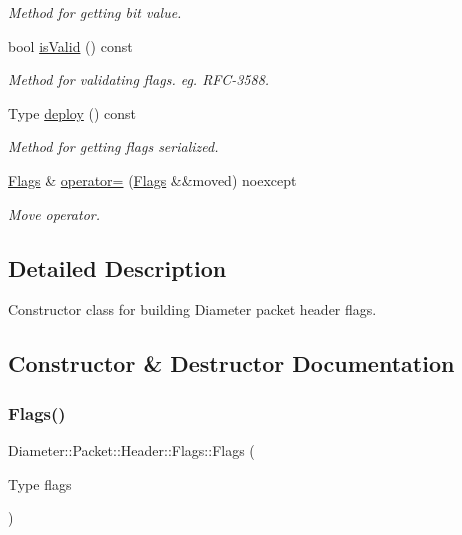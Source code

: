 \begin{DoxyCompactItemize}
\begin{DoxyCompactList}\small\item\em Method for getting bit value. \end{DoxyCompactList}\item 
bool \hyperlink{classDiameter_1_1Packet_1_1Header_1_1Flags_ae577fd786c656522b958395fb140dd8d}{is\+Valid} () const
\begin{DoxyCompactList}\small\item\em Method for validating flags. eg. R\+F\+C-\/3588. \end{DoxyCompactList}\item 
Type \hyperlink{classDiameter_1_1Packet_1_1Header_1_1Flags_a6bb796dff7f3e8f128262fb2d3a549bb}{deploy} () const
\begin{DoxyCompactList}\small\item\em Method for getting flags serialized. \end{DoxyCompactList}\item 
\hyperlink{classDiameter_1_1Packet_1_1Header_1_1Flags}{Flags} \& \hyperlink{classDiameter_1_1Packet_1_1Header_1_1Flags_afd99abaebff289fdc859696929fea0da}{operator=} (\hyperlink{classDiameter_1_1Packet_1_1Header_1_1Flags}{Flags} \&\&moved) noexcept
\begin{DoxyCompactList}\small\item\em Move operator. \end{DoxyCompactList}\end{DoxyCompactItemize}


\subsection{Detailed Description}
Constructor class for building Diameter packet header flags. 

\subsection{Constructor \& Destructor Documentation}
\mbox{\label{classDiameter_1_1Packet_1_1Header_1_1Flags_a76ab5597a6d9a396bb810f8ac8ebbfce}} 
\subsubsection{\texorpdfstring{Flags()}{Flags()}\hspace{0.1cm}{\footnotesize\ttfamily [1/3]}}
{\footnotesize\ttfamily Diameter\+::\+Packet\+::\+Header\+::\+Flags\+::\+Flags (\begin{DoxyParamCaption}\item[{Type}]{flags }\end{DoxyParamCaption})\hspace{0.3cm}{\ttfamily [explicit]}}



